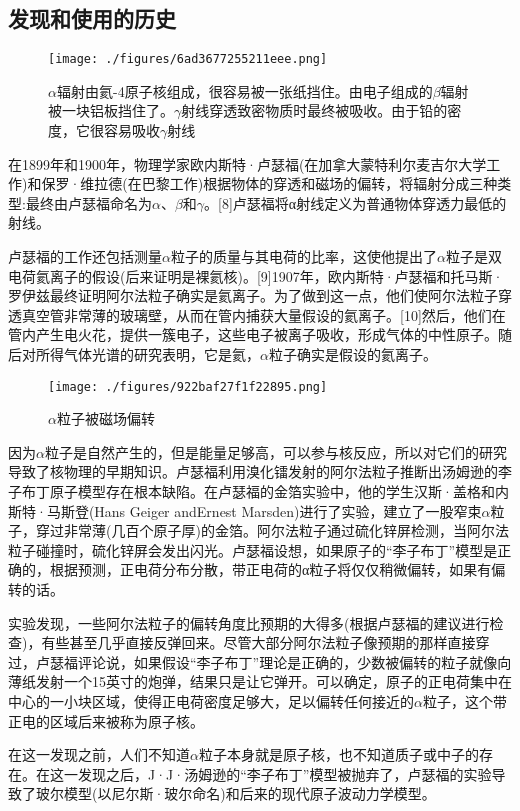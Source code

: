 \subsection{发现和使用的历史}
\begin{figure}[ht]
\centering
\texttt{[image: ./figures/6ad3677255211eee.png]}
\caption{$\alpha$辐射由氦-4原子核组成，很容易被一张纸挡住。由电子组成的$\beta$辐射被一块铝板挡住了。$\gamma$射线穿透致密物质时最终被吸收。由于铅的密度，它很容易吸收$\gamma$射线} \label{fig_ALZ_3}
\end{figure}
在1899年和1900年，物理学家欧内斯特·卢瑟福(在加拿大蒙特利尔麦吉尔大学工作)和保罗·维拉德(在巴黎工作)根据物体的穿透和磁场的偏转，将辐射分成三种类型:最终由卢瑟福命名为$\alpha$、$\beta$和$\gamma$。[8]卢瑟福将α射线定义为普通物体穿透力最低的射线。

卢瑟福的工作还包括测量$\alpha$粒子的质量与其电荷的比率，这使他提出了$\alpha$粒子是双电荷氦离子的假设(后来证明是裸氦核)。[9]1907年，欧内斯特·卢瑟福和托马斯·罗伊兹最终证明阿尔法粒子确实是氦离子。为了做到这一点，他们使阿尔法粒子穿透真空管非常薄的玻璃壁，从而在管内捕获大量假设的氦离子。[10]然后，他们在管内产生电火花，提供一簇电子，这些电子被离子吸收，形成气体的中性原子。随后对所得气体光谱的研究表明，它是氦，$\alpha$粒子确实是假设的氦离子。
\begin{figure}[ht]
\centering
\texttt{[image: ./figures/922baf27f1f22895.png]}
\caption{$\alpha$粒子被磁场偏转} \label{fig_ALZ_4}
\end{figure}
因为$\alpha$粒子是自然产生的，但是能量足够高，可以参与核反应，所以对它们的研究导致了核物理的早期知识。卢瑟福利用溴化镭发射的阿尔法粒子推断出汤姆逊的李子布丁原子模型存在根本缺陷。在卢瑟福的金箔实验中，他的学生汉斯·盖格和内斯特·马斯登(Hans Geiger andErnest Marsden)进行了实验，建立了一股窄束$\alpha$粒子，穿过非常薄(几百个原子厚)的金箔。阿尔法粒子通过硫化锌屏检测，当阿尔法粒子碰撞时，硫化锌屏会发出闪光。卢瑟福设想，如果原子的“李子布丁”模型是正确的，根据预测，正电荷分布分散，带正电荷的α粒子将仅仅稍微偏转，如果有偏转的话。

实验发现，一些阿尔法粒子的偏转角度比预期的大得多(根据卢瑟福的建议进行检查)，有些甚至几乎直接反弹回来。尽管大部分阿尔法粒子像预期的那样直接穿过，卢瑟福评论说，如果假设“李子布丁”理论是正确的，少数被偏转的粒子就像向薄纸发射一个15英寸的炮弹，结果只是让它弹开。可以确定，原子的正电荷集中在中心的一小块区域，使得正电荷密度足够大，足以偏转任何接近的$\alpha$粒子，这个带正电的区域后来被称为原子核。

在这一发现之前，人们不知道$\alpha$粒子本身就是原子核，也不知道质子或中子的存在。在这一发现之后，J·J·汤姆逊的“李子布丁”模型被抛弃了，卢瑟福的实验导致了玻尔模型(以尼尔斯·玻尔命名)和后来的现代原子波动力学模型。


